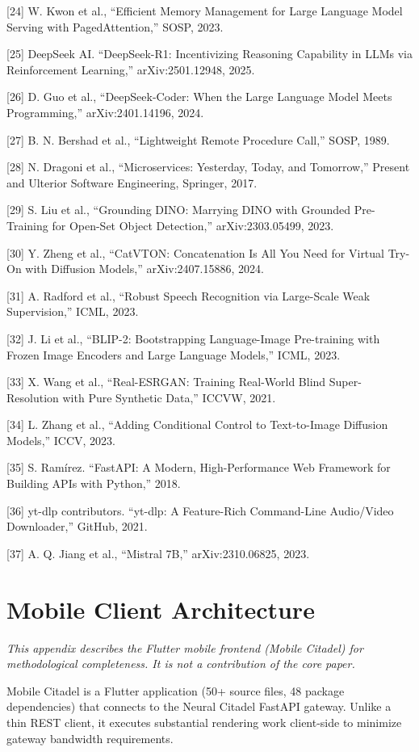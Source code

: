 \documentclass[conference]{IEEEtran}
\begin{document}
[24] W. Kwon et al., ``Efficient Memory Management for Large Language Model Serving with PagedAttention,'' SOSP, 2023.

[25] DeepSeek AI. ``DeepSeek-R1: Incentivizing Reasoning Capability in LLMs via Reinforcement Learning,'' arXiv:2501.12948, 2025.

[26] D. Guo et al., ``DeepSeek-Coder: When the Large Language Model Meets Programming,'' arXiv:2401.14196, 2024.

[27] B. N. Bershad et al., ``Lightweight Remote Procedure Call,'' SOSP, 1989.

[28] N. Dragoni et al., ``Microservices: Yesterday, Today, and Tomorrow,'' Present and Ulterior Software Engineering, Springer, 2017.

[29] S. Liu et al., ``Grounding DINO: Marrying DINO with Grounded Pre-Training for Open-Set Object Detection,'' arXiv:2303.05499, 2023.

[30] Y. Zheng et al., ``CatVTON: Concatenation Is All You Need for Virtual Try-On with Diffusion Models,'' arXiv:2407.15886, 2024.

[31] A. Radford et al., ``Robust Speech Recognition via Large-Scale Weak Supervision,'' ICML, 2023.

[32] J. Li et al., ``BLIP-2: Bootstrapping Language-Image Pre-training with Frozen Image Encoders and Large Language Models,'' ICML, 2023.

[33] X. Wang et al., ``Real-ESRGAN: Training Real-World Blind Super-Resolution with Pure Synthetic Data,'' ICCVW, 2021.

[34] L. Zhang et al., ``Adding Conditional Control to Text-to-Image Diffusion Models,'' ICCV, 2023.

[35] S. Ramírez. ``FastAPI: A Modern, High-Performance Web Framework for Building APIs with Python,'' 2018. 

[36] yt-dlp contributors. ``yt-dlp: A Feature-Rich Command-Line Audio/Video Downloader,'' GitHub, 2021.

[37] A. Q. Jiang et al., ``Mistral 7B,'' arXiv:2310.06825, 2023.

\appendices
\section{Mobile Client Architecture}
\textit{This appendix describes the Flutter mobile frontend (Mobile Citadel) for methodological completeness. It is not a contribution of the core paper.}

Mobile Citadel is a Flutter application (50+ source files, 48 package dependencies) that connects to the Neural Citadel FastAPI gateway. Unlike a thin REST client, it executes substantial rendering work client-side to minimize gateway bandwidth requirements.
\end{document}
